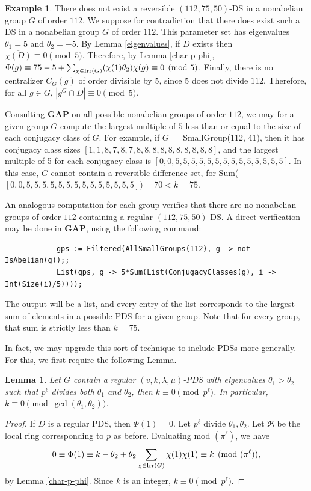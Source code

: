 \documentclass[12pt]{amsproc} %
\newtheorem{lem}[thm]{Lemma}
\theoremstyle{definition}\newtheorem{defn}[thm]{Definition}
\theoremstyle{definition}\newtheorem{rem}[thm]{Remark}
\theoremstyle{definition}\newtheorem{ex}[thm]{Example}
\newcommand{\Irr}{{\rm Irr}}
\newcommand{\GAP}{\textbf{{\rm GAP}}}
\newcommand{\frakR}{\mathfrak{R}}
\begin{document}
\begin{ex}\label{No-DS}
There does not exist a reversible $(112, 75, 50)$-DS in a nonabelian group $G$ of order $112$. We suppose for contradiction that there does exist such a DS in a nonabelian group $G$ of order $112$. This parameter set has eigenvalues $\theta_1=5$ and $\theta_2=-5$. By Lemma \ref{eigenvalues}, if $D$ exists then $\overline{\chi(D)} \equiv 0 \pmod 5$. Therefore, by Lemma \ref{char-p-phi}, $\Phi(g) \equiv 75 - 5 + \sum_{\chi\in\Irr(G)}(\chi(1)\theta_2)\chi(g) \equiv 0 \pmod 5$. Finally, there is no centralizer $C_G(g)$ of order divisible by $5$, since $5$ does not divide $112$. Therefore, for all $g\in G$, $|g^G \cap D| \equiv 0 \pmod 5$.

	Consulting \GAP \cite{GAP4} on all possible nonabelian groups of order $112$, we may for a given group $G$ compute the largest multiple of $5$ less than or equal to the size of each conjugacy class of $G$. For example, if $G = $ SmallGroup(112, 41), then it has conjugacy class sizes $[ 1, 1, 8, 7, 8, 7, 8, 8, 8, 8, 8, 8, 8, 8, 8, 8 ]$, and the largest multiple of 5 for each conjugacy class is $[ 0, 0, 5, 5, 5, 5, 5, 5, 5, 5, 5, 5, 5, 5, 5, 5]$. In this case, $G$ cannot contain a reversible difference set, for Sum($[ 0, 0, 5, 5, 5, 5, 5, 5, 5, 5, 5, 5, 5, 5, 5, 5]) = 70 < k = 75$.
	
	An analogous computation for each group verifies that there are no nonabelian groups of order $112$ containing a regular $(112, 75, 50)$-DS. A direct verification may be done in \GAP \cite{GAP4}, using the following command:

		\begin{verbatim}
			gps := Filtered(AllSmallGroups(112), g -> not IsAbelian(g));;
			List(gps, g -> 5*Sum(List(ConjugacyClasses(g), i -> Int(Size(i)/5))));
		\end{verbatim}
	The output will be a list, and every entry of the list corresponds to the largest sum of elements in a possible PDS for a given group. Note that for every group, that sum is strictly less than $k = 75$.
	\end{ex}


In fact, we may upgrade this sort of technique to include PDSs more generally. For this, we first require the following Lemma.

\begin{lem}\label{k-mod-p}
Let $G$ contain a regular $(v, k, \lambda, \mu)$-PDS with eigenvalues $\theta_1 > \theta_2$ such that $p^\ell$ divides both $\theta_1$ and $\theta_2$, then $k \equiv 0 \pmod {p^\ell}$. In particular, $k \equiv 0 \pmod {\gcd(\theta_1, \theta_2)}$.
\end{lem}
	\begin{proof}
	If $D$ is a regular PDS, then $\Phi(1) = 0$. Let $p^\ell$ divide $\theta_1, \theta_2$. Let $\frakR$ be the local ring corresponding to $p$ as before. Evaluating mod $(\pi^\ell)$, we have
	\[0 \equiv \Phi(1) \equiv k - \theta_2 + \theta_2\sum_{\chi\in\Irr(G)}\chi(1)\chi(1) \equiv k \pmod {(\pi^\ell)},\] by Lemma \ref{char-p-phi}. Since $k$ is an integer, $k \equiv 0 \pmod {p^\ell}$.
	\end{proof}
\end{document}
